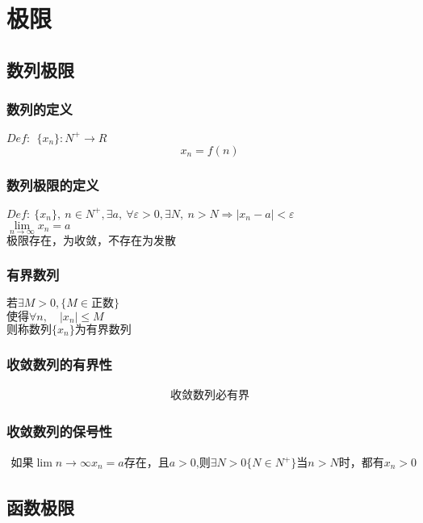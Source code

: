 \section{极限}
\subsection{数列极限}
\subsubsection{数列的定义}
$Def:\ \ \{x_n\}: N^+\rightarrow R $
$$x_n = f(n)$$
\subsubsection{数列极限的定义}
$Def:\ \{x_n\},\ n\in N^+,\exists  a,\ \forall\varepsilon>0,\exists N,\ n>N\Rightarrow \left|x_n-a\right|<\varepsilon$\\
$\lim\limits_{n \to \infty}{x_n}=a$\\ 
$\mbox{极限存在，为收敛，不存在为发散}$
\subsubsection{有界数列}
$\mbox{若}\exists M>0,\{M\in\mbox{正数}\}$\\
$\mbox{使得}\forall n,\quad\left|x_n\right|\leqslant M$\\
$\mbox{则称数列$\{x_n\}$为有界数列}$
\subsubsection{收敛数列的有界性}
\begin{align}
    \mbox{收敛数列必有界}\label{sequence_bounded}
\end{align}
\subsubsection{收敛数列的保号性}
\begin{align}
    \mbox{如果$\lim\limits{n \to\infty}x_n=a$存在，且$a>0$,则$\exists N>0\{N\in N^+\}$当$n>N$时，都有$x_n>0$}\label{Serial_number_preservation}
\end{align}

\subsection{函数极限}
